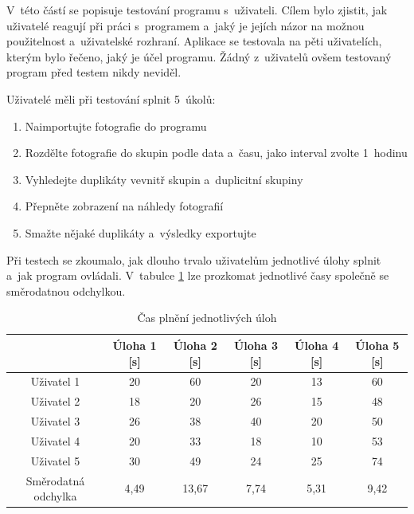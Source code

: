 V~této částí se popisuje testování programu s~uživateli. Cílem bylo zjistit, jak uživatelé reagují při práci s~programem a~jaký je jejích názor na možnou použitelnost a~uživatelské rozhraní. Aplikace se testovala na pěti uživatelích, kterým bylo řečeno, jaký je účel programu. Žádný z~uživatelů ovšem testovaný program před testem nikdy neviděl. 

Uživatelé měli při testování splnit 5~úkolů:

\begin{enumerate}
\item Naimportujte fotografie do programu
\item Rozdělte fotografie do skupin podle data a~času, jako interval zvolte 1~hodinu
\item Vyhledejte duplikáty vevnitř skupin a~duplicitní skupiny
\item Přepněte zobrazení na náhledy fotografií
\item Smažte nějaké duplikáty a~výsledky exportujte
\end{enumerate}

Při testech se zkoumalo, jak dlouho trvalo uživatelům jednotlivé úlohy splnit a~jak program ovládali. V~tabulce \ref{Table_cas} lze prozkomat jednotlivé časy společně se směrodatnou odchylkou.

\begin{table}[h]
\centering
\begin{tabular}{|c|c|c|c|c|c|}
\hline
                    & Úloha 1 [s] & Úloha 2 [s] & Úloha 3 [s] & Úloha 4 [s] & Úloha 5 [s] \\ \hline
Uživatel 1          & 20          & 60          & 20          & 13          & 60          \\ \hline
Uživatel 2          & 18          & 20          & 26          & 15          & 48          \\ \hline
Uživatel 3          & 26          & 38          & 40          & 20          & 50          \\ \hline
Uživatel 4          & 20          & 33          & 18          & 10          & 53          \\ \hline
Uživatel 5          & 30          & 49          & 24          & 25          & 74          \\ \hline
Směrodatná odchylka & 4,49        & 13,67       & 7,74        & 5,31        & 9,42        \\ \hline
\end{tabular}
\caption{Čas plnění jednotlivých úloh}
\label{Table_cas}
\end{table}

